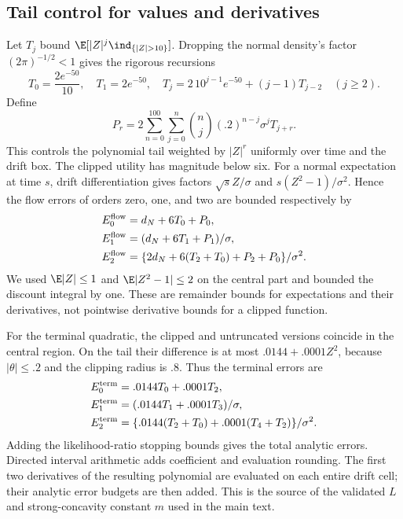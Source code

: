 \subsection{Tail control for values and derivatives}
Let $T_j$ bound $\E[|Z|^j\ind_{\{|Z|>10\}}]$. Dropping the normal density's factor $(2\pi)^{-1/2}<1$ gives the rigorous recursions
\begin{equation}
 T_0=\frac{2e^{-50}}{10},\quad T_1=2e^{-50},\quad
 T_j=2\,10^{j-1}e^{-50}+(j-1)T_{j-2}\quad(j\ge2).
\end{equation}
Define
\begin{equation}
 P_r=2\sum_{n=0}^{100}\sum_{j=0}^{n}{n\choose j}(.2)^{n-j}\sigma^jT_{j+r}.
\end{equation}
This controls the polynomial tail weighted by $|Z|^r$ uniformly over time and the drift box. The clipped utility has magnitude below six. For a normal expectation at time $s$, drift differentiation gives factors $\sqrt{s}Z/\sigma$ and $s(Z^2-1)/\sigma^2$. Hence the flow errors of orders zero, one, and two are bounded respectively by
\begin{align}
 E_0^{\rm flow}&=d_N+6T_0+P_0,\\
 E_1^{\rm flow}&=(d_N+6T_1+P_1)/\sigma,\\
 E_2^{\rm flow}&=\{2d_N+6(T_2+T_0)+P_2+P_0\}/\sigma^2.
\end{align}
We used $\E|Z|\le1$ and $\E|Z^2-1|\le2$ on the central part and bounded the discount integral by one. These are remainder bounds for expectations and their derivatives, not pointwise derivative bounds for a clipped function.

For the terminal quadratic, the clipped and untruncated versions coincide in the central region. On the tail their difference is at most $.0144+.0001Z^2$, because $|\theta|\le.2$ and the clipping radius is $.8$. Thus the terminal errors are
\begin{align}
 E_0^{\rm term}&=.0144T_0+.0001T_2,\\
 E_1^{\rm term}&=(.0144T_1+.0001T_3)/\sigma,\\
 E_2^{\rm term}&=\{.0144(T_2+T_0)+.0001(T_4+T_2)\}/\sigma^2.
\end{align}
Adding the likelihood-ratio stopping bounds gives the total analytic errors. Directed interval arithmetic adds coefficient and evaluation rounding. The first two derivatives of the resulting polynomial are evaluated on each entire drift cell; their analytic error budgets are then added. This is the source of the validated $L$ and strong-concavity constant $m$ used in the main text.

